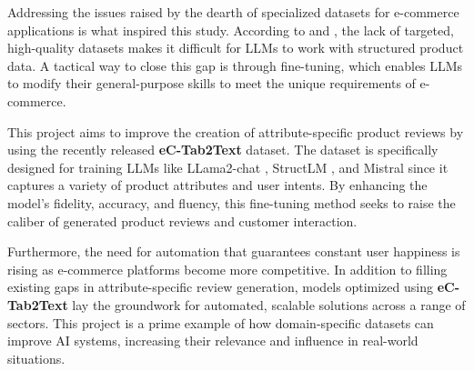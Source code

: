 Addressing the issues raised by the dearth of specialized datasets for e-commerce applications is what inspired this study. According to \cite{macková2023promap} and \cite{Wang2023Emotional}, the lack of targeted, high-quality datasets makes it difficult for LLMs to work with structured product data. A tactical way to close this gap is through fine-tuning, which enables LLMs to modify their general-purpose skills to meet the unique requirements of e-commerce.

This project aims to improve the creation of attribute-specific product reviews by using the recently released \textbf{eC-Tab2Text} dataset. The dataset is specifically designed for training LLMs like LLama2-chat \cite{touvron2023llama}, StructLM \cite{zhuang2024structlm}, and Mistral \cite{jiang2023mistral} since it captures a variety of product attributes and user intents. By enhancing the model's fidelity, accuracy, and fluency, this fine-tuning method seeks to raise the caliber of generated product reviews and customer interaction.

Furthermore, the need for automation that guarantees constant user happiness is rising as e-commerce platforms become more competitive. In addition to filling existing gaps in attribute-specific review generation, models optimized using \textbf{eC-Tab2Text} lay the groundwork for automated, scalable solutions across a range of sectors. This project is a prime example of how domain-specific datasets can improve AI systems, increasing their relevance and influence in real-world situations.